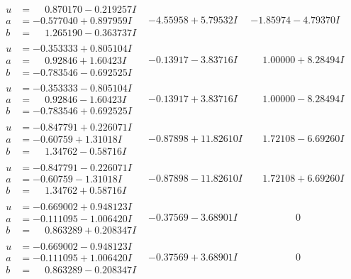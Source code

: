 \documentclass[1p]{elsarticle_modified}
\theoremstyle{definition}
\begin{document}
$$\begin{array}{c|c|c}
\begin{aligned}
u &= \phantom{-}0.870170 - 0.219257 I \\
a &= -0.577040 + 0.897959 I \\
b &= \phantom{-}1.265190 - 0.363737 I\end{aligned}
 & -4.55958 + 5.79532 I & -1.85974 - 4.79370 I \\ \hline\begin{aligned}
u &= -0.353333 + 0.805104 I \\
a &= \phantom{-}0.92846 + 1.60423 I \\
b &= -0.783546 - 0.692525 I\end{aligned}
 & -0.13917 - 3.83716 I & \phantom{-}1.00000 + 8.28494 I \\ \hline\begin{aligned}
u &= -0.353333 - 0.805104 I \\
a &= \phantom{-}0.92846 - 1.60423 I \\
b &= -0.783546 + 0.692525 I\end{aligned}
 & -0.13917 + 3.83716 I & \phantom{-}1.00000 - 8.28494 I \\ \hline\begin{aligned}
u &= -0.847791 + 0.226071 I \\
a &= -0.60759 + 1.31018 I \\
b &= \phantom{-}1.34762 - 0.58716 I\end{aligned}
 & -0.87898 + 11.82610 I & \phantom{-}1.72108 - 6.69260 I \\ \hline\begin{aligned}
u &= -0.847791 - 0.226071 I \\
a &= -0.60759 - 1.31018 I \\
b &= \phantom{-}1.34762 + 0.58716 I\end{aligned}
 & -0.87898 - 11.82610 I & \phantom{-}1.72108 + 6.69260 I \\ \hline\begin{aligned}
u &= -0.669002 + 0.948123 I \\
a &= -0.111095 - 1.006420 I \\
b &= \phantom{-}0.863289 + 0.208347 I\end{aligned}
 & -0.37569 - 3.68901 I & \phantom{-0.000000 } 0 \\ \hline\begin{aligned}
u &= -0.669002 - 0.948123 I \\
a &= -0.111095 + 1.006420 I \\
b &= \phantom{-}0.863289 - 0.208347 I\end{aligned}
 & -0.37569 + 3.68901 I & \phantom{-0.000000 } 0 \\ \hline\begin{aligned}

\end{aligned}
\end{array}$$
\end{document}
